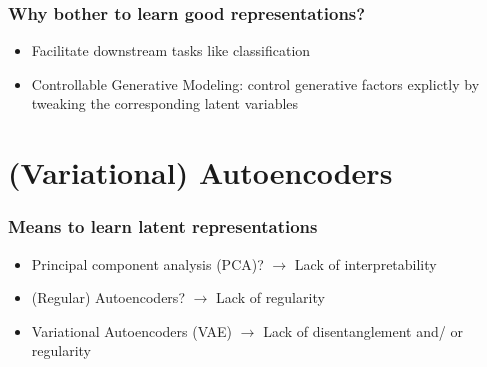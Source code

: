 \documentclass{beamer}
\theoremstyle{definition}
\begin{document}
    \begin{frame}
        \frametitle{Why bother to learn good representations?}
        \begin{itemize}
          \item Facilitate downstream tasks like classification
          \item Controllable Generative Modeling: control generative factors explictly by tweaking the corresponding latent variables
        \end{itemize}
      \end{frame}

    \section{(Variational) Autoencoders}
    \begin{frame}
      \frametitle{Means to learn latent representations}
      \begin{itemize}
        \item Principal component analysis (PCA)? $\rightarrow$ Lack of interpretability
        \item (Regular) Autoencoders? $\rightarrow$ Lack of regularity
        \item Variational Autoencoders (VAE) $\rightarrow$ Lack of disentanglement and/ or regularity
      \end{itemize}
    \end{frame}
\end{document}
